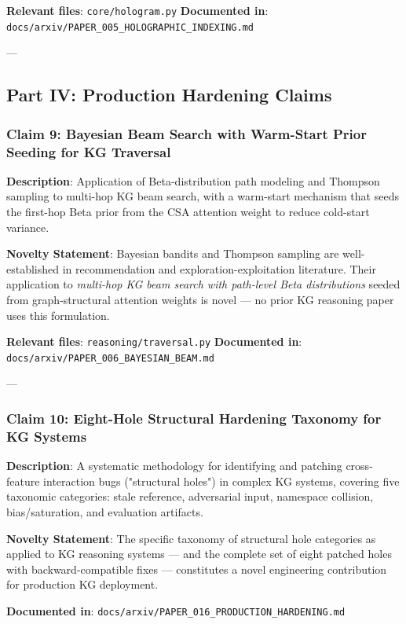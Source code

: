 \documentclass[10pt,journal,compsoc]{IEEEtran}
\begin{document}
\textbf{Relevant files}: \texttt{core/hologram.py}
\textbf{Documented in}: \texttt{docs/arxiv/PAPER\_005\_HOLOGRAPHIC\_INDEXING.md}

---

\subsection{Part IV: Production Hardening Claims}

\subsubsection{Claim 9: Bayesian Beam Search with Warm-Start Prior Seeding for KG Traversal}

\textbf{Description}: Application of Beta-distr\-ibution path modeling and Thompson sampling to multi-hop KG beam search, with a warm-start mechanism that seeds the first-hop Beta prior from the CSA attention weight to reduce cold-start variance.

\textbf{Novelty Statement}: Bayesian bandits and Thompson sampling are well-established in recom\-mendation and exploration-explo\-itation literature. Their application to \textit{multi-hop KG beam search with path-level Beta distr\-ibutions} seeded from graph-structural attention weights is novel — no prior KG reasoning paper uses this formulation.

\textbf{Relevant files}: \texttt{reasoning/traversal.py}
\textbf{Documented in}: \texttt{docs/arxiv/PAPER\_006\_BAYESIAN\_BEAM.md}

---

\subsubsection{Claim 10: Eight-Hole Structural Hardening Taxonomy for KG Systems}

\textbf{Description}: A systematic methodology for identifying and patching cross-feature interaction bugs ("structural holes") in complex KG systems, covering five taxonomic categories: stale reference, adversarial input, namespace collision, bias/saturation, and evaluation artifacts.

\textbf{Novelty Statement}: The specific taxonomy of structural hole categories as applied to KG reasoning systems — and the complete set of eight patched holes with backward-compatible fixes — constitutes a novel engineering contr\-ibution for production KG deployment.

\textbf{Documented in}: \texttt{docs/arxiv/PAPER\_016\_PRODUCTION\_HARDENING.md}
\end{document}
